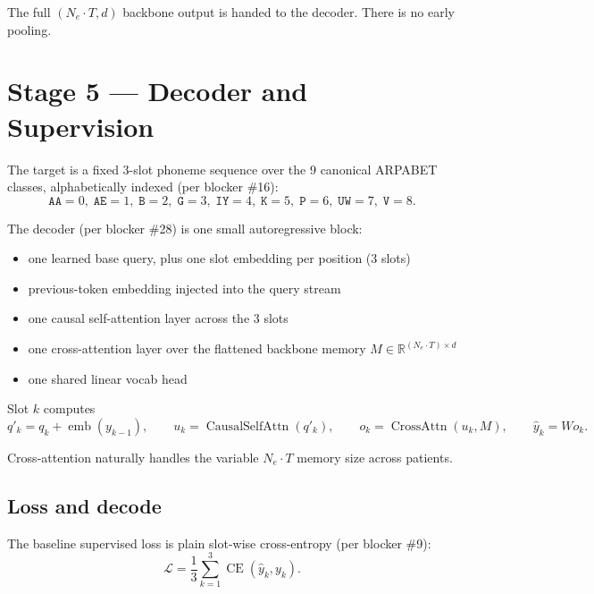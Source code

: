 \documentclass[11pt,letterpaper]{article}
\newcommand{\R}{\mathbb{R}}
\begin{document}
The full $(N_e \cdot T, d)$ backbone output is handed to the decoder. There is no early pooling.


\section{Stage 5 --- Decoder and Supervision}

The target is a fixed 3-slot phoneme sequence over the 9 canonical ARPABET classes, alphabetically indexed (per blocker \#16):
\begin{equation}
\texttt{AA}=0,\;
\texttt{AE}=1,\;
\texttt{B}=2,\;
\texttt{G}=3,\;
\texttt{IY}=4,\;
\texttt{K}=5,\;
\texttt{P}=6,\;
\texttt{UW}=7,\;
\texttt{V}=8.
\end{equation}

The decoder (per blocker \#28) is one small autoregressive block:
\begin{itemize}[leftmargin=2em, itemsep=0.2em]
\item one learned base query, plus one slot embedding per position (3 slots)
\item previous-token embedding injected into the query stream
\item one causal self-attention layer across the 3 slots
\item one cross-attention layer over the flattened backbone memory $M \in \R^{(N_e \cdot T) \times d}$
\item one shared linear vocab head
\end{itemize}

Slot $k$ computes
\begin{equation}
q'_k = q_k + \operatorname{emb}(y_{k-1}),
\qquad
u_k = \operatorname{CausalSelfAttn}(q'_k),
\qquad
o_k = \operatorname{CrossAttn}(u_k, M),
\qquad
\hat{y}_k = W o_k.
\end{equation}

Cross-attention naturally handles the variable $N_e \cdot T$ memory size across patients.

\subsection{Loss and decode}

The baseline supervised loss is plain slot-wise cross-entropy (per blocker \#9):
\begin{equation}
\mathcal{L} = \frac{1}{3}\sum_{k=1}^{3} \operatorname{CE}(\hat{y}_k, y_k).
\end{equation}
\end{document}

